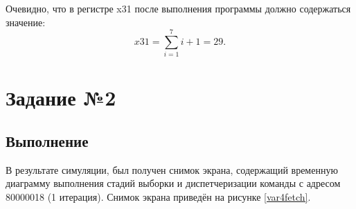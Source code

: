 Очевидно, что в регистре x31 после выполнения программы должно содержаться значение:
\begin{displaymath}
	x31 = \sum\limits_{i=1}^7{i} + 1 = 29.
\end{displaymath}
\newpage

\chapter{Задание №2}
\section{Выполнение}
В результате симуляции, был получен снимок экрана, содержащий временную диаграмму выполнения стадий выборки и диспетчеризации команды с адресом 80000018 (1 итерация). Снимок экрана приведён на рисунке \ref{var4fetch}.


